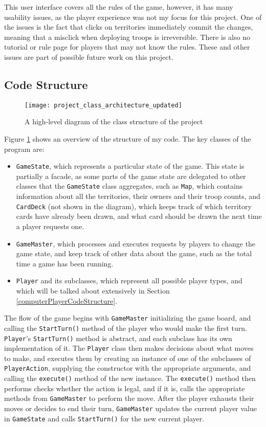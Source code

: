 This user interface covers all the rules of the game, however, it has many usability issues, as the player experience was not my focus for this project. One of the issues is the fact that clicks on territories immediately commit the changes, meaning that a misclick when deploying troops is irreversible. There is also no tutorial or rule page for players that may not know the rules. These and other issues are part of possible future work on this project.

\subsection{Code Structure}
\label{codeStructure}
\begin{figure}[H]
\texttt{[image: project\_class\_architecture\_updated]}
\caption{A high-level diagram of the class structure of the project}
\label{fig:UMLDiagram}
\end{figure}

Figure \ref{fig:UMLDiagram} shows an overview of the structure of my code. The key classes of the program are:
\begin{itemize}
\item \texttt{GameState}, which represents a particular state of the game. This state is partially a facade, as some parts of the game state are delegated to other classes that the \texttt{GameState} class aggregates, such as \texttt{Map}, which contains information about all the territories, their owners and their troop counts, and \texttt{CardDeck} (not shown in the diagram), which keeps track of which territory cards have already been drawn, and what card should be drawn the next time a player requests one.
\item \texttt{GameMaster}, which processes and executes requests by players to change the game state, and keep track of other data about the game, such as the total time a game has been running.
\item \texttt{Player} and its subclasses, which represent all possible player types, and which will be talked about extensively in Section \ref{computerPlayerCodeStructure}.
\end{itemize}

The flow of the game begins with \texttt{GameMaster} initializing the game board, and calling the \texttt{StartTurn()} method of the player who would make the first turn. \texttt{Player}'s \texttt{StartTurn()} method is abstract, and each subclass has its own implementation of it. The \texttt{Player} class then makes decisions about what moves to make, and executes them by creating an instance of one of the subclasses of \texttt{PlayerAction}, supplying the constructor with the appropriate arguments, and calling the \texttt{execute()} method of the new instance. The \texttt{execute()} method then performs checks whether the action is legal, and if it is, calls the appropriate methods from \texttt{GameMaster} to perform the move. After the player exhausts their moves or decides to end their turn, \texttt{GameMaster} updates the current player value in \texttt{GameState} and calls \texttt{StartTurn()} for the new current player.

